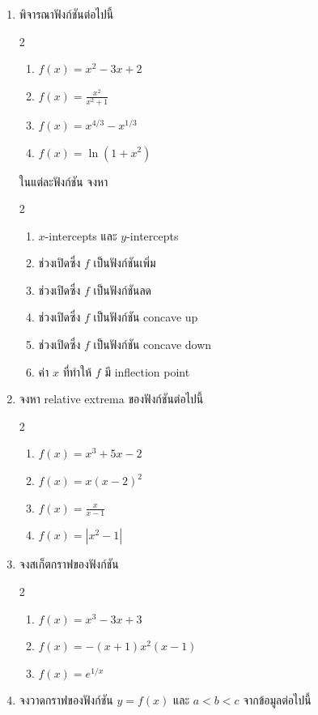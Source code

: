 \documentclass[
]{book}
\theoremstyle{definition}
\theoremstyle{definition}
\theoremstyle{definition}
\theoremstyle{definition}
\theoremstyle{remark}
\begin{document}
\begin{enumerate}
\def\labelenumi{\arabic{enumi}.}
\item
  พิจารณาฟังก์ชันต่อไปนี้

  2

  \begin{enumerate}
  \def\labelenumii{\arabic{enumii}.}
  \item
    \(\displaystyle f(x) = x^2-3x+2\)
  \item
    \(\displaystyle f(x) = \frac{x^2}{x^2+1}\)
  \item
    \(\displaystyle f(x) = x^{4/3} - x^{1/3}\)
  \item
    \(\displaystyle f(x) = \ln(1+x^2)\)
  \end{enumerate}

  ในแต่ละฟังก์ชัน จงหา

  2

  \begin{enumerate}
  \def\labelenumii{\arabic{enumii}.}
  \item
    \(x\)-intercepts และ \(y\)-intercepts
  \item
    ช่วงเปิดซึ่ง \(f\) เป็นฟังก์ชันเพิ่ม
  \item
    ช่วงเปิดซึ่ง \(f\) เป็นฟังก์ชันลด
  \item
    ช่วงเปิดซึ่ง \(f\) เป็นฟังก์ชัน concave up
  \item
    ช่วงเปิดซึ่ง \(f\) เป็นฟังก์ชัน concave down
  \item
    ค่า \(x\) ที่ทำให้ \(f\) มี inflection point
  \end{enumerate}
\item
  จงหา relative extrema ของฟังก์ชันต่อไปนี้

  2

  \begin{enumerate}
  \def\labelenumii{\arabic{enumii}.}
  \item
    \(\displaystyle f(x) = x^3+5x-2\)
  \item
    \(\displaystyle f(x) = x(x-2)^2\)
  \item
    \(\displaystyle f(x) = \frac{x}{x-1}\)
  \item
    \(\displaystyle f(x) = |x^2-1|\)
  \end{enumerate}
\item
  จงสเก็ตกราฟของฟังก์ชัน

  2

  \begin{enumerate}
  \def\labelenumii{\arabic{enumii}.}
  \item
    \(f(x) = x^3-3x+3\)
  \item
    \(f(x) = -(x+1)x^2(x-1)\)
  \item
    \(f(x) = e^{1/x}\)
  \end{enumerate}
\item
  จงวาดกราฟของฟังก์ชัน \(y=f(x)\) และ \(a<b<c\) จากข้อมูลต่อไปนี้


\end{enumerate}
\end{document}

